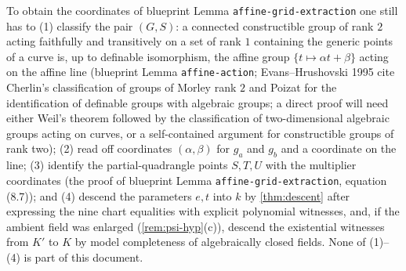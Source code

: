 \begin{remark}\label{rem:remaining}
To obtain the coordinates of blueprint Lemma \texttt{affine-grid-extraction} one still
has to (1) classify the pair $(G,S)$: a connected constructible group of rank $2$ acting
faithfully and transitively on a set of rank $1$ containing the generic points of a curve
is, up to definable isomorphism, the affine group $\{t\mapsto\alpha t+\beta\}$ acting on
the affine line (blueprint Lemma \texttt{affine-action}; Evans--Hrushovski 1995 cite
Cherlin's classification of groups of Morley rank $2$ and Poizat for the identification
of definable groups with algebraic groups; a direct proof will need either Weil's
theorem followed by the classification of two-dimensional algebraic groups acting on
curves, or a self-contained argument for constructible groups of rank two); (2) read off
coordinates $(\alpha,\beta)$ for $g_a$ and $g_b$ and a coordinate on the line;
(3) identify the partial-quadrangle points $S,T,U$ with the multiplier coordinates
(the proof of blueprint Lemma \texttt{affine-grid-extraction}, equation (8.7)); and
(4) descend the parameters $e,t$ into $k$ by
\cref{thm:descent} after expressing the nine chart equalities with explicit polynomial
witnesses, and, if the ambient field was enlarged (\cref{rem:psi-hyp}(c)), descend the
existential witnesses from $K'$ to $K$ by model completeness of algebraically closed
fields.  None of (1)--(4) is part of this document.
\end{remark}
